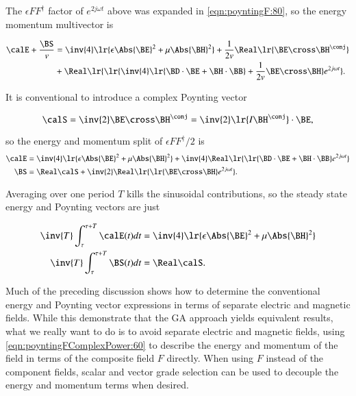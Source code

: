 The \( \epsilon F F^\dagger \) factor of \( e^{2 j \omega t} \) above was expanded in \cref{eqn:poyntingF:80}, so the energy momentum multivector is

\begin{dmath}\label{eqn:poyntingFComplexPower:220}
\begin{aligned}
\calE + \frac{\BS}{v}
&=
\inv{4} \lr{
\epsilon \Abs{\BE}^2 + \mu \Abs{\BH}^2 }
+
\frac{1}{2 v} \Real \lr{
\BE \cross \BH^\conj
} \\
&+
\Real
\lr{
   \lr{
     \inv{4} \lr{ \BD \cdot \BE + \BH \cdot \BB}
   + \frac{1}{2 v} \BE \cross \BH
   }
   e^{2 j \omega t }
}.
\end{aligned}
\end{dmath}

It is conventional to introduce a complex Poynting vector

\begin{equation}\label{eqn:poyntingFComplexPower:240}
\calS = \inv{2} \BE \cross \BH^\conj = \inv{2} \lr{ I \BH^\conj } \cdot \BE,
\end{equation}

so the energy and momentum split of \( \epsilon F F^\dagger/2 \) is
\begin{dmath}\label{eqn:poyntingFComplexPower:260}
\begin{aligned}
\calE &=
\inv{4} \lr{
\epsilon \Abs{\BE}^2 + \mu \Abs{\BH}^2 }
+
\inv{4} \Real
\lr{
   \lr{ \BD \cdot \BE + \BH \cdot \BB}
   e^{2 j \omega t }
} \\
\BS &= \Real \calS
+
\inv{2} \Real
\lr{
\lr{ \BE \cross \BH }
   e^{2 j \omega t }
}.
\end{aligned}
\end{dmath}

Averaging over one period \( T \) kills the sinusoidal contributions, so the steady state energy and Poynting vectors are just

\begin{dmath}\label{eqn:poyntingFComplexPower:280}
\begin{aligned}
\inv{T} \int_\tau^{\tau+T} \calE(t) dt &=
\inv{4} \lr{
\epsilon \Abs{\BE}^2 + \mu \Abs{\BH}^2 } \\
\inv{T} \int_\tau^{\tau+T} \BS(t) dt &= \Real \calS.
\end{aligned}
\end{dmath}

Much of the preceding discussion shows how to determine the conventional energy and Poynting vector expressions in terms of separate electric and magnetic fields.
While this demonstrate that the GA approach yields equivalent results, what we really want to do is to
avoid separate electric and magnetic fields, using
\cref{eqn:poyntingFComplexPower:60} to describe the energy and momentum of the field in terms of the composite field \( F \) directly.
When using \( F \) instead of the component fields,
scalar and vector grade selection can be used to decouple the energy and momentum terms when desired.
